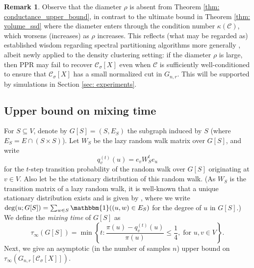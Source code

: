\documentclass[11pt,twoside]{article}
\theoremstyle{definition}
\newtheorem{remark}{Remark}
\newcommand{\set}[1]{\left\{#1\right\}}
\newcommand{\vol}{\mathrm{vol}}
\newcommand{\1}{\mathbbm{1}}
\newcommand{\Xbf}{X}
\newcommand{\Wbf}{W}
\newcommand{\Cset}{\mathcal{C}}
\newcommand{\Csig}{\Cset_{\sigma}}
\begin{document}
\begin{remark}
  Observe that the diameter $\rho$ is absent from Theorem \ref{thm:
    conductance_upper_bound}, in contrast to the ultimate bound in Theorem    
  \ref{thm: volume_ssd} where the diameter enters through the condition number 
  $\kappa(\Cset)$, which worsens (increases) as $\rho$ increases. This reflects
  (what may be regarded as) established wisdom regarding spectral partitioning
  algorithms more generally \citep{guattery1995, hein2010}, albeit newly applied
  to the density clustering setting: if the diameter $\rho$ is large, then PPR
  may fail to recover $\Csig[\Xbf]$ even when $\Cset$ is sufficiently
  well-conditioned to ensure that $\Csig[\Xbf]$ has a small normalized cut in 
  $G_{n,r}$. This will be supported by simulations in Section \ref{sec:
    experiments}.   
\end{remark}

\subsection{Upper bound on mixing time} 

For $S \subseteq V$, denote by $G[S] = (S, E_S)$ the
subgraph induced by $S$ (where $E_S = E \cap (S \times S)$). Let 
$\Wbf_S$ be the lazy random walk matrix over $G[S]$, and write  
$$
q_{v}^{(t)}(u) = e_v\Wbf_S^t e_u
$$
for the $t$-step transition probability of the random walk over $G[S]$
originating at $v \in V$. Also let  be 
the stationary distribution of this random walk. (As $\Wbf_S$ is the transition 
matrix of a lazy random walk, it is well-known that a unique stationary
distribution exists and is given by  \smash{$\pi(u) = \deg(u;G[S])/\vol(S;
  G[S])$}, where we write $\deg(u;G[S]) = \sum_{w \in S} \1((u,w) \in E_S)$ for
the degree of $u$ in $G[S]$.) We define the \emph{mixing time} of $G[S]$ as 
\begin{equation}
\label{eqn: mixing_time}
\tau_{\infty}(G[S]) = \min\set{ t: \frac{\pi(u) - q_{v}^{(t)}(u)}
  {\pi(u)} \leq \frac{1}{4}, \; \text{for $u,v \in V$}}. 
\end{equation}
Next, we give an asymptotic (in the number of samples $n$) upper bound on
$\tau_{\infty}(G_{n,r}[\Csig[\Xbf]])$.  
\end{document}
